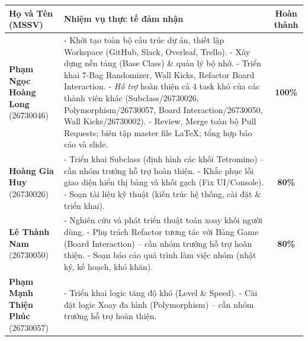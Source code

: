\begin{table}[H]
    \centering
    \renewcommand{\arraystretch}{1.5}
    \begin{tabular}{|p{3.8cm}|p{7.5cm}|c|}
        \hline
        \textbf{Họ và Tên (MSSV)} & \textbf{Nhiệm vụ thực tế đảm nhận} & \textbf{Hoàn thành} \\
        \hline
        \textbf{Phạm Ngọc Hoàng Long} \newline (26730046) &
        - Khởi tạo toàn bộ cấu trúc dự án, thiết lập Workspace (GitHub, Slack, Overleaf, Trello).\newline
        - Xây dựng nền tảng (Base Class) \& quản lý bộ nhớ.\newline
        - Triển khai 7-Bag Randomizer, Wall Kicks, Refactor Board Interaction.\newline
        - \textit{Hỗ trợ} hoàn thiện cả 4 task khó của các thành viên khác (Subclass/26730026, Polymorphism/26730057, Board Interaction/26730050, Wall Kicks/26730002).\newline
        - Review, Merge toàn bộ Pull Requests; biên tập master file \LaTeX; tổng hợp báo cáo và slide. &
        \textbf{100\%} \\
        \hline
        \textbf{Hoàng Gia Huy} \newline (26730026) &
        - Triển khai Subclass (định hình các khối Tetromino) -- cần nhóm trưởng hỗ trợ hoàn thiện.\newline
        - Khắc phục lỗi giao diện hiển thị bảng và khối gạch (Fix UI/Console).\newline
        - Soạn tài liệu kỹ thuật (kiến trúc hệ thống, cài đặt \& triển khai). &
        \textbf{80\%} \\
        \hline
        \textbf{Lê Thành Nam} \newline (26730050) &
        - Nghiên cứu và phát triển thuật toán xoay khối người dùng.\newline
        - Phụ trách Refactor tương tác với Bảng Game (Board Interaction) -- cần nhóm trưởng hỗ trợ hoàn thiện.\newline
        - Soạn báo cáo quá trình làm việc nhóm (nhật ký, kế hoạch, khó khăn). &
        \textbf{80\%} \\
        \hline
        \textbf{Phạm Mạnh Thiện Phúc} \newline (26730057) &
        - Triển khai logic tăng độ khó (Level \& Speed).\newline
        - Cài đặt logic Xoay đa hình (Polymorphism) -- cần nhóm trưởng hỗ trợ hoàn thiện.\newline

\end{tabular}
\end{table}

